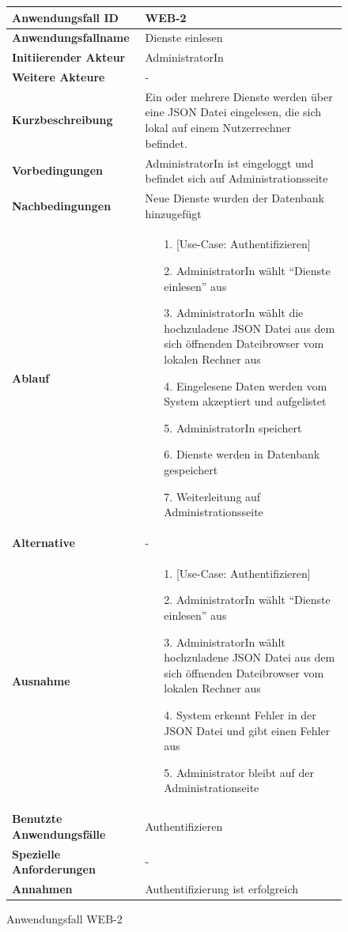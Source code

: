 \begin{figure}[h]
	\centering
	\begin{tabularx}{\textwidth}{ X | X }
		\textbf{Anwendungsfall ID} & WEB-2 \\ \hline
		\textbf{Anwendungsfallname} & Dienste einlesen \\ \hline
		\textbf{Initiierender Akteur} & AdministratorIn \\ \hline
		\textbf{Weitere Akteure} & - \\ \hline
		\textbf{Kurzbeschreibung} & Ein oder mehrere Dienste werden über eine JSON Datei eingelesen, die sich lokal auf einem Nutzerrechner befindet. \\ \hline
		\textbf{Vorbedingungen} & AdministratorIn ist eingeloggt und befindet sich auf Administrationsseite \\ \hline
		\textbf{Nachbedingungen} & Neue Dienste wurden der Datenbank hinzugefügt \\ \hline
		\textbf{Ablauf} &
		\begin{enumerate}
			\item [1.] [Use-Case: Authentifizieren]
			\item [2.] AdministratorIn wählt ``Dienste einlesen'' aus
			\item [3.] AdministratorIn wählt die hochzuladene JSON Datei aus dem sich öffnenden Dateibrowser vom lokalen Rechner aus
			\item [4.] Eingelesene Daten werden vom System akzeptiert und aufgelistet
			\item [5.] AdministratorIn speichert
			\item [6.] Dienste werden in Datenbank gespeichert
			\item [7.] Weiterleitung auf Administrationsseite
		\end{enumerate} \\ \hline
		\textbf{Alternative} & - \\ \hline
		\textbf{Ausnahme} &
		\begin{enumerate}
			\item [1.]  [Use-Case: Authentifizieren]
			\item [2.]  AdministratorIn wählt ``Dienste einlesen'' aus
			\item [3.]  AdministratorIn wählt hochzuladene JSON Datei aus dem sich öffnenden Dateibrowser vom lokalen Rechner aus
			\item [4.]  System erkennt Fehler in der JSON Datei und gibt einen Fehler aus
			\item [5.]  Administrator bleibt auf der Administrationseite
		\end{enumerate}  \\ \hline
		\textbf{Benutzte Anwendungsfälle} & Authentifizieren \\ \hline
		\textbf{Spezielle Anforderungen} & - \\ \hline
		\textbf{Annahmen} & Authentifizierung ist erfolgreich
	\end{tabularx}
	\caption{Anwendungsfall WEB-2}
	\label{fig:anwendungsfall-server-tabelle-web-2}
\end{figure}

